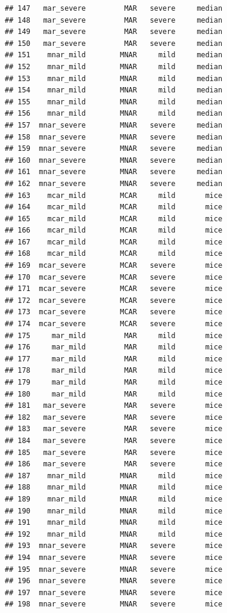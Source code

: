 \documentclass[
]{article}
\begin{document}
\begin{verbatim}
## 147   mar_severe         MAR   severe     median
## 148   mar_severe         MAR   severe     median
## 149   mar_severe         MAR   severe     median
## 150   mar_severe         MAR   severe     median
## 151    mnar_mild        MNAR     mild     median
## 152    mnar_mild        MNAR     mild     median
## 153    mnar_mild        MNAR     mild     median
## 154    mnar_mild        MNAR     mild     median
## 155    mnar_mild        MNAR     mild     median
## 156    mnar_mild        MNAR     mild     median
## 157  mnar_severe        MNAR   severe     median
## 158  mnar_severe        MNAR   severe     median
## 159  mnar_severe        MNAR   severe     median
## 160  mnar_severe        MNAR   severe     median
## 161  mnar_severe        MNAR   severe     median
## 162  mnar_severe        MNAR   severe     median
## 163    mcar_mild        MCAR     mild       mice
## 164    mcar_mild        MCAR     mild       mice
## 165    mcar_mild        MCAR     mild       mice
## 166    mcar_mild        MCAR     mild       mice
## 167    mcar_mild        MCAR     mild       mice
## 168    mcar_mild        MCAR     mild       mice
## 169  mcar_severe        MCAR   severe       mice
## 170  mcar_severe        MCAR   severe       mice
## 171  mcar_severe        MCAR   severe       mice
## 172  mcar_severe        MCAR   severe       mice
## 173  mcar_severe        MCAR   severe       mice
## 174  mcar_severe        MCAR   severe       mice
## 175     mar_mild         MAR     mild       mice
## 176     mar_mild         MAR     mild       mice
## 177     mar_mild         MAR     mild       mice
## 178     mar_mild         MAR     mild       mice
## 179     mar_mild         MAR     mild       mice
## 180     mar_mild         MAR     mild       mice
## 181   mar_severe         MAR   severe       mice
## 182   mar_severe         MAR   severe       mice
## 183   mar_severe         MAR   severe       mice
## 184   mar_severe         MAR   severe       mice
## 185   mar_severe         MAR   severe       mice
## 186   mar_severe         MAR   severe       mice
## 187    mnar_mild        MNAR     mild       mice
## 188    mnar_mild        MNAR     mild       mice
## 189    mnar_mild        MNAR     mild       mice
## 190    mnar_mild        MNAR     mild       mice
## 191    mnar_mild        MNAR     mild       mice
## 192    mnar_mild        MNAR     mild       mice
## 193  mnar_severe        MNAR   severe       mice
## 194  mnar_severe        MNAR   severe       mice
## 195  mnar_severe        MNAR   severe       mice
## 196  mnar_severe        MNAR   severe       mice
## 197  mnar_severe        MNAR   severe       mice
## 198  mnar_severe        MNAR   severe       mice
\end{verbatim}
\end{document}
